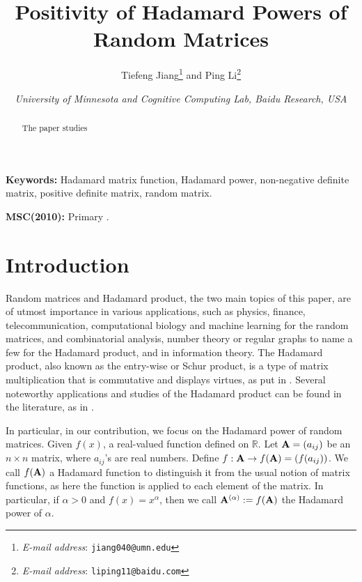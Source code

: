 \documentclass[conference,letterpaper]{IEEEtran}
\numberwithin{equation}{section}
\newcommand{\bd}{\bold}
\begin{document}
\title{Positivity of Hadamard Powers of Random Matrices}
\author{Tiefeng Jiang\thanks{ \textsl{E-mail address}:
\texttt{jiang040@umn.edu}} and  Ping Li\thanks{ \textsl{E-mail address}:
\texttt{liping11@baidu.com}} }
\date{\small \it University of Minnesota and Cognitive Computing Lab, Baidu Research, USA}
\maketitle
\begin{abstract}
\noindent The paper studies
\end{abstract}



\noindent\textbf{Keywords:} Hadamard matrix function, Hadamard power, non-negative definite matrix, positive definite matrix, random matrix.

\medskip

\noindent\textbf{MSC(2010):} Primary .\\
[0.5cm]


\section{Introduction}
Random matrices and Hadamard product, the two main topics of this paper, are of utmost importance in various applications, such as physics, finance, telecommunication, computational biology and machine learning for the random matrices, and combinatorial analysis, number theory or regular graphs to name a few for the Hadamard product, and in information theory.
The Hadamard product, also known as the entry-wise or Schur product, is a type of matrix multiplication that is commutative and displays  virtues, as put in \cite{horadam2012hadamard}. 
Several noteworthy applications and studies of the Hadamard product can be found in the literature, as in \cite{hedayat1978hadamard,agaian2006hadamard,bulutoglu2009counterexample,audenaert2010spectral}.

In particular, in our contribution, we focus on the Hadamard power of random matrices. 
Given $f(x)$, a real-valued function defined on $\mathbb{R}.$ Let $\bd{A}=(a_{ij})$ be an $n\times n$ matrix, where $a_{ij}$'s are real numbers.  Define $f: \bd{A} \rightarrow f(\bd{A)}=(f(a_{i j}))$. We call $f(\bd{A})$  a Hadamard function to distinguish it from the usual notion of matrix functions, as here the function is applied to each element of the matrix. 
In particular, if $\alpha>0$ and  $f(x)=x^{\alpha}$, then we call  $\bd{A}^{(\alpha)}:=f(\bd{A})$ the Hadamard power of $\alpha$. 
\end{document}
